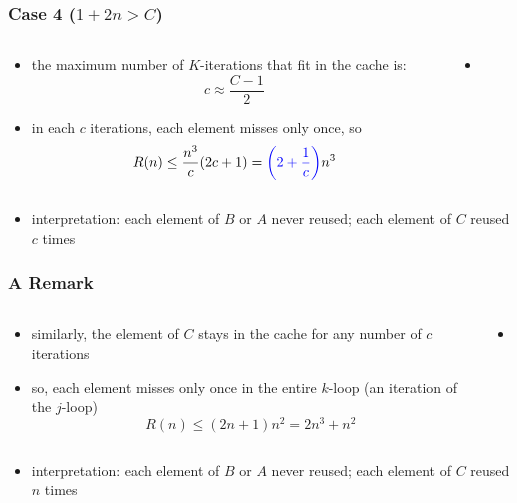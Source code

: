 \documentclass[12pt,dvipdfmx]{beamer}
\newcommand{\ao}[1]{{\color{blue}#1}}
\begin{document}
\begin{frame}
\frametitle{Case 4 ($1 + 2n > C$)}
\begin{columns}
  \begin{column}{0.5\textwidth}
\begin{itemize}
\item the maximum number of $K$-iterations
  that fit in the cache is:
\[ c \approx \frac{C - 1}{2} \]
\item in each $c$ iterations, each element misses only once, so
\[ R(n) \leq \frac{n^3}{c} (2c + 1)
= \ao{\left(2 + \frac{1}{c}\right)} n^3
\]
\end{itemize}
  \end{column}

  \begin{column}{0.5\textwidth}
    \begin{itemize}
    \item []
{\tiny\def\svgwidth{0.9\textwidth}}
\end{itemize}
\end{column}
\end{columns}

\begin{itemize}
\item []
\ao{interpretation:} each element of $B$ or $A$ never reused; each element of $C$
reused $c$ times
\end{itemize}
\end{frame}

\begin{frame}
\frametitle{A Remark}
\begin{columns}
  \begin{column}{0.5\textwidth}
\begin{itemize}
\item similarly, the element of $C$ stays in the cache for any number of
  $c$ iterations
\item so, each element misses only once in the entire $k$-loop (an iteration of the $j$-loop)
\[ R(n) \leq (2n + 1) n^2 = 2n^3 + n^2 \]
\end{itemize}
  \end{column}

  \begin{column}{0.5\textwidth}
    \begin{itemize}
    \item []
{\tiny\def\svgwidth{0.9\textwidth}}
\end{itemize}
\end{column}
\end{columns}

\begin{itemize}
\item []
\ao{interpretation:} each element of $B$ or $A$ never reused; each element of $C$
reused $n$ times
\end{itemize}
\end{frame}
\end{document}
